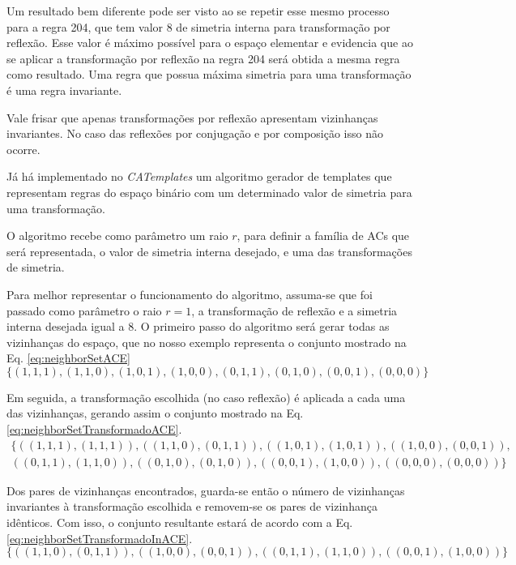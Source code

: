 Um resultado bem diferente pode ser visto ao se repetir esse mesmo processo para a regra 204, que tem valor 8 de simetria interna para transformação por reflexão. Esse valor é máximo possível para o espaço elementar e evidencia que ao se aplicar a transformação por reflexão na regra 204 será obtida a mesma regra como resultado. Uma regra que possua máxima simetria para uma transformação é uma regra invariante.

Vale frisar que apenas transformações por reflexão apresentam vizinhanças invariantes. No caso das reflexões por conjugação e por composição isso não ocorre.

Já há implementado no \textit{CATemplates} um algoritmo gerador de templates que representam regras do espaço binário com um determinado valor de simetria para uma transformação.

O algoritmo recebe como parâmetro um raio $r$, para definir a família de ACs que será representada, o valor de simetria interna desejado, e uma das transformações de simetria.

Para melhor representar o funcionamento do algoritmo, assuma-se que foi passado como parâmetro o raio $r = 1$, a transformação de reflexão e a simetria interna desejada igual a 8. O primeiro passo do algoritmo será gerar todas as vizinhanças do espaço, que no nosso exemplo representa o conjunto mostrado na Eq. \eqref{eq:neighborSetACE}
\begin{equation}
\{(1,1,1),(1,1,0),
(1,0,1),(1,0,0),
(0,1,1),(0,1,0),
(0,0,1),(0,0,0)\}
\label{eq:neighborSetACE}
\end{equation}

Em seguida, a transformação escolhida (no caso reflexão) é aplicada a cada uma das vizinhanças, gerando assim o conjunto mostrado na Eq. \eqref{eq:neighborSetTransformadoACE}.  
\begin{equation}
\begin{split}
\{
((1,1,1),(1,1,1)),
((1,1,0),(0,1,1)),
((1,0,1),(1,0,1)),
((1,0,0),(0,0,1)),\\
((0,1,1),(1,1,0)),
((0,1,0),(0,1,0)),
((0,0,1),(1,0,0)),
((0,0,0),(0,0,0))\}
\label{eq:neighborSetTransformadoACE}
\end{split}
\end{equation}

Dos pares de vizinhanças encontrados, guarda-se então o número de vizinhanças invariantes à transformação escolhida e removem-se os pares de vizinhança idênticos. Com isso, o conjunto resultante estará de acordo com a Eq. \eqref{eq:neighborSetTransformadoInACE}.
\begin{equation}
\{((1,1,0),(0,1,1)),
((1,0,0),(0,0,1)),
((0,1,1),(1,1,0)),
((0,0,1),(1,0,0))\}
\label{eq:neighborSetTransformadoInACE}
\end{equation}


